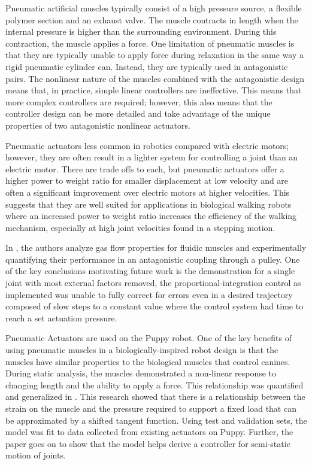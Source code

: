 
Pneumatic artificial muscles typically consist of a high pressure source, a
flexible polymer section and an exhaust valve. The muscle contracts in length
when the internal pressure is higher than the surrounding environment. During
this contraction, the muscle applies a force. One limitation of pneumatic
muscles is that they are typically unable to apply force during relaxation in
the same way a rigid pneumatic cylinder can. Instead, they are typically used in
antagonistic pairs. The nonlinear nature of the muscles combined with the
antagonistic design means that, in practice, simple linear controllers are
ineffective. This means that more complex controllers are required; however,
this also means that the controller design can be more detailed and take
advantage of the unique properties of two antagonistic nonlinear actuators.

Pneumatic actuators less common in robotics compared with electric motors;
however,
they are often result in a lighter system for controlling a joint than an
electric motor. There are trade offs to each, but pneumatic actuators offer a
higher power to weight ratio for smaller displacement at low velocity and are
often a significant improvement over electric motors at higher velocities.
\cite{Tavakoli2008} This suggests that they are well suited for applications in
biological walking robots where an increased power to weight ratio increases
the efficiency of the walking mechanism, especially at high joint velocities
found in a stepping motion.


In \cite{Situm2008}, the authors analyze gas flow properties for fluidic muscles
and experimentally quantifying their performance in an antagonistic coupling
through a pulley. One of the key conclusions motivating future work is the
demonstration for a single joint with most external factors removed, the
proportional-integration control as implemented was unable to fully correct for
errors even in a desired trajectory composed of slow steps to a constant value
where the control system had time to reach a set actuation pressure.

Pneumatic Actuators are used on the Puppy robot. One of the key
benefits of using pneumatic muscles in a biologically-inspired robot design is
that the muscles have similar properties to the biological muscles that control
canines. \cite{Tavakoli2008}
During static analysis, the muscles demonstrated a non-linear response to
changing length and the ability to apply a force. This relationship was
quantified and generalized in \cite{HuntPMuscles}. This research showed that
there is a relationship between the strain on the muscle and the pressure
required to support a fixed load that can be approximated by a shifted tangent
function. Using test and validation sets, the model was fit to data collected
from existing actuators on Puppy. Further, the paper goes on to show that the
model helps derive a controller for semi-static motion of joints. 
\cite{HuntPMuscles}


